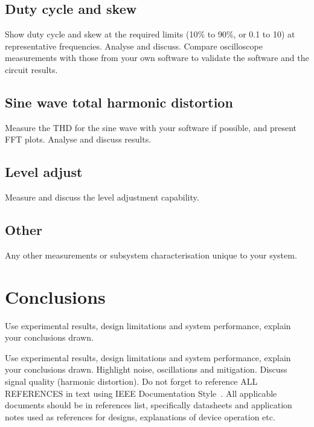 \documentclass[11pt,a4paper]{article}
\begin{document}
\subsection{Duty cycle and skew}

Show duty cycle and skew at the required limits (10\% to 90\%, or 0.1 to 10) at representative frequencies. Analyse and discuss. Compare oscilloscope measurements with those from your own software to validate the software and the circuit results.

\subsection{Sine wave total harmonic distortion}

Measure the THD for the sine wave with your software if possible, and present FFT plots. Analyse and discuss results.

\subsection{Level adjust}

Measure and discuss the level adjustment capability.

\subsection{Other}

Any other measurements or subsystem characterisation unique to your system.


\newpage
\section{Conclusions}
Use experimental results, design limitations and system performance, explain your conclusions drawn.

Use experimental results, design limitations and system performance, explain your conclusions drawn.
Highlight noise, oscillations and mitigation. Discuss signal quality (harmonic distortion).
Do not forget to reference ALL REFERENCES in text using IEEE Documentation Style~\cite{IEEErefguide:2023}.
All applicable documents should be in references list, specifically datasheets and application notes \cite{lm555:2014} used as references for designs, explanations of device operation etc.
\end{document}
